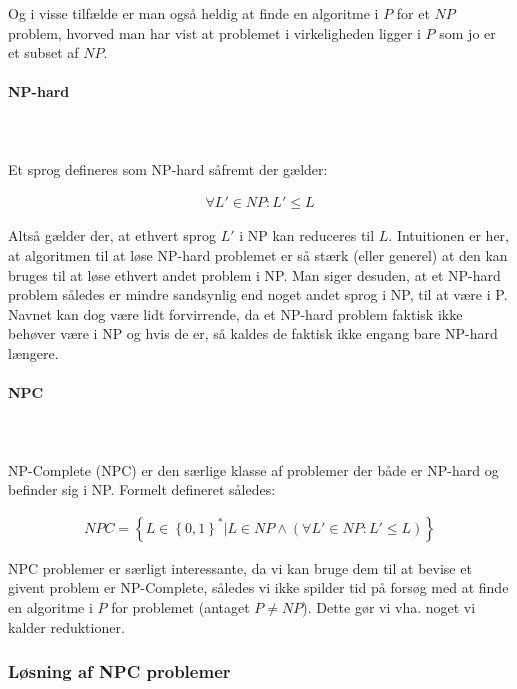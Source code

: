 Og i visse tilfælde er man også heldig at finde en algoritme i $P$ for et $NP$ problem, hvorved man har vist at problemet i virkeligheden ligger i $P$ som jo er et subset af $NP$.

\paragraph{NP-hard}
~\\
~\\
Et sprog defineres som NP-hard såfremt der gælder:

\begin{align*}
 \forall L' \in NP: L' \leq L
\end{align*}

Altså gælder der, at ethvert sprog $L'$ i NP kan reduceres til $L$. Intuitionen er her, at algoritmen til at løse NP-hard problemet er så stærk (eller generel) at den kan bruges til at løse ethvert andet problem i NP. Man siger desuden, at et NP-hard problem således er mindre sandsynlig end noget andet sprog i NP, til at være i P.\\

Navnet kan dog være lidt forvirrende, da et NP-hard problem faktisk ikke behøver være i NP og hvis de er, så kaldes de faktisk ikke engang bare NP-hard længere.

\paragraph{NPC}
~\\
~\\
NP-Complete (NPC) er den særlige klasse af problemer der både er NP-hard og befinder sig i NP. Formelt defineret således: 

\begin{align*}
 NPC = \left\lbrace L \in \left\lbrace 0,1 \right\rbrace^* | L \in NP \wedge (\forall L' \in NP: L' \leq L) \right\rbrace
\end{align*}

NPC problemer er særligt interessante, da vi kan bruge dem til at bevise et givent problem er NP-Complete, således vi ikke spilder tid på forsøg med at finde en algoritme i $P$ for problemet (antaget $P\neq NP$). Dette gør vi vha. noget vi kalder reduktioner.


\subsubsection{Løsning af NPC problemer}

